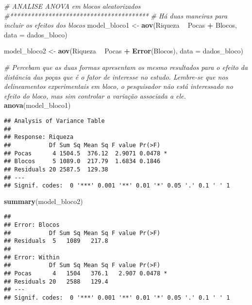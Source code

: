 \documentclass[
]{book}
\newenvironment{Shaded}{\begin{snugshade}}{\end{snugshade}}
\newcommand{\CommentTok}[1]{\textcolor[rgb]{0.56,0.35,0.01}{\textit{#1}}}
\newcommand{\DataTypeTok}[1]{\textcolor[rgb]{0.13,0.29,0.53}{#1}}
\newcommand{\KeywordTok}[1]{\textcolor[rgb]{0.13,0.29,0.53}{\textbf{#1}}}
\newcommand{\NormalTok}[1]{#1}
\newcommand{\OperatorTok}[1]{\textcolor[rgb]{0.81,0.36,0.00}{\textbf{#1}}}
\newcommand{\StringTok}[1]{\textcolor[rgb]{0.31,0.60,0.02}{#1}}
\begin{document}
\begin{Shaded}
\begin{Highlighting}[]
\CommentTok{# ANALISE ANOVA em blocos aleatorizados}
\CommentTok{#****************************************}
\CommentTok{# Há duas maneiras para incluir os efeitos dos blocos}
\NormalTok{model_bloco1 <-}\StringTok{ }\KeywordTok{aov}\NormalTok{(Riqueza }\OperatorTok{~}\StringTok{ }\NormalTok{Pocas }\OperatorTok{+}\StringTok{ }\NormalTok{Blocos, }\DataTypeTok{data =}\NormalTok{ dados_bloco)}

\NormalTok{model_bloco2 <-}\StringTok{ }\KeywordTok{aov}\NormalTok{(Riqueza }\OperatorTok{~}\StringTok{ }\NormalTok{Pocas }\OperatorTok{+}\StringTok{ }\KeywordTok{Error}\NormalTok{(Blocos), }\DataTypeTok{data =}\NormalTok{ dados_bloco)}

\CommentTok{# Percebam que as duas formas apresentam os mesmo resultados para o efeito da distância das poças que é o fator de interesse no estudo. Lembre-se que nos delineamentos experimentais em bloco, o pesquisador não está interessado no efeito do bloco, mas sim controlar a variação associada a ele.}
\KeywordTok{anova}\NormalTok{(model_bloco1)}
\end{Highlighting}
\end{Shaded}

\begin{verbatim}
## Analysis of Variance Table
## 
## Response: Riqueza
##           Df Sum Sq Mean Sq F value Pr(>F)  
## Pocas      4 1504.5  376.12  2.9071 0.0478 *
## Blocos     5 1089.0  217.79  1.6834 0.1846  
## Residuals 20 2587.5  129.38                 
## ---
## Signif. codes:  0 '***' 0.001 '**' 0.01 '*' 0.05 '.' 0.1 ' ' 1
\end{verbatim}

\begin{Shaded}
\begin{Highlighting}[]
\KeywordTok{summary}\NormalTok{(model_bloco2)}
\end{Highlighting}
\end{Shaded}

\begin{verbatim}
## 
## Error: Blocos
##           Df Sum Sq Mean Sq F value Pr(>F)
## Residuals  5   1089   217.8               
## 
## Error: Within
##           Df Sum Sq Mean Sq F value Pr(>F)  
## Pocas      4   1504   376.1   2.907 0.0478 *
## Residuals 20   2588   129.4                 
## ---
## Signif. codes:  0 '***' 0.001 '**' 0.01 '*' 0.05 '.' 0.1 ' ' 1
\end{verbatim}
\end{document}
